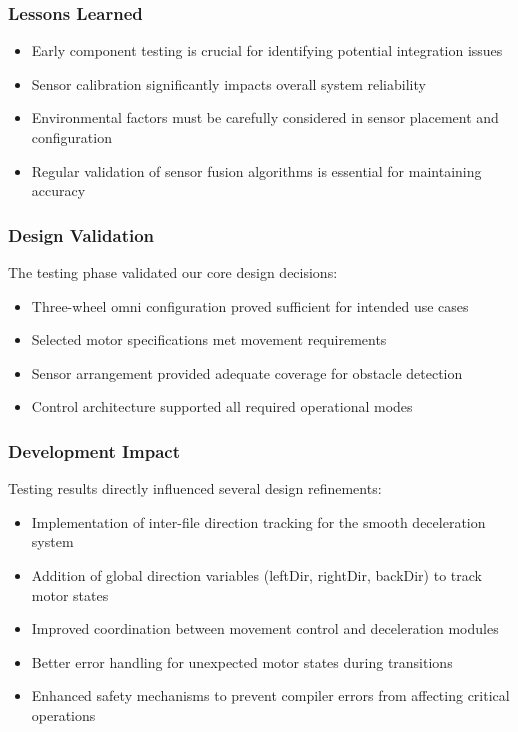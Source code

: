 \documentclass{article}
\begin{document}
\subsubsection{Lessons Learned}
\begin{itemize}
    \item Early component testing is crucial for identifying potential integration issues
    \item Sensor calibration significantly impacts overall system reliability
    \item Environmental factors must be carefully considered in sensor placement and configuration
    \item Regular validation of sensor fusion algorithms is essential for maintaining accuracy
\end{itemize}

\subsubsection{Design Validation}
The testing phase validated our core design decisions:
\begin{itemize}
    \item Three-wheel omni configuration proved sufficient for intended use cases
    \item Selected motor specifications met movement requirements
    \item Sensor arrangement provided adequate coverage for obstacle detection
    \item Control architecture supported all required operational modes
\end{itemize}

\subsubsection{Development Impact}
Testing results directly influenced several design refinements:
\begin{itemize}
    \item Implementation of inter-file direction tracking for the smooth deceleration system
    \item Addition of global direction variables (leftDir, rightDir, backDir) to track motor states
    \item Improved coordination between movement control and deceleration modules
    \item Better error handling for unexpected motor states during transitions
    \item Enhanced safety mechanisms to prevent compiler errors from affecting critical operations
\end{itemize}
\end{document}
